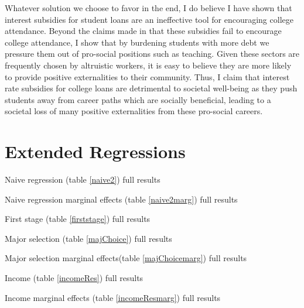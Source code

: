 \documentclass[12pt]{article}
\newcommand{\regs}{../Analysis/Regressions/Output/}
\begin{document}
	Whatever solution we choose to favor in the end, I do believe I have shown that interest subsidies for student loans are an ineffective tool for encouraging college attendance. Beyond the claims made in  \textcite{dynarski2015} that these subsidies fail to encourage college attendance, I show that by burdening students with more debt we pressure them out of pro-social positions such as teaching. Given these sectors are frequently chosen by altruistic workers, it is easy to believe they are more likely to provide positive externalities to their community. Thus, I claim that interest rate subsidies for college loans are detrimental to societal well-being as they push students away from career paths which are socially beneficial, leading to a societal loss of many positive externalities from these pro-social careers.
	
	
	
	
	\clearpage
	\appendix
	\section{Extended Regressions}
	
	\begin{table}
		\centering
		\caption{Naive regression (table \ref{naive2}) full results}
		\resizebox{\textwidth}{!}{
			
		}
		\label{naivefull}
	\end{table}

	\begin{table}
		\centering
		\caption{Naive regression marginal effects (table \ref{naive2marg}) full results}
		\resizebox{\textwidth}{!}{
			
		}
	\end{table}

	\begin{table}
		\centering
		\scriptsize
		\caption{First stage (table \ref{firststage}) full results}
		
		\label{firststagefull}
	\end{table}

	\begin{table}
		\centering
		\scriptsize
		\caption{Major selection (table \ref{majChoice}) full results}
		
		\label{majChoiceFull}
	\end{table}

	\begin{table}
		\centering
		\scriptsize
		\caption{Major selection marginal effects(table \ref{majChoicemarg}) full results}
		
		\label{majChoiceFullmarg}
	\end{table}

	\begin{table}
		\centering
		\scriptsize
		\caption{Income (table \ref{incomeRes}) full results}
		
	\end{table}

	\begin{table}
		\centering
		\scriptsize
		\caption{Income marginal effects (table \ref{incomeResmarg}) full results}
		
	\end{table}
	\clearpage
	
	\printbibliography
	
\end{document}
